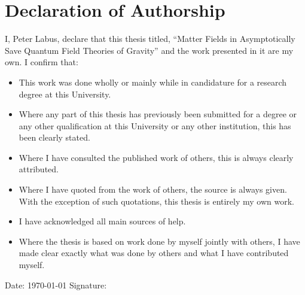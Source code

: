 \documentclass[11pt]{book}
\numberwithin{equation}{chapter}
\begin{document}

\chapter*{Declaration of Authorship}

\noindent I, Peter Labus, declare that this thesis titled,
``Matter Fields in Asymptotically Save Quantum Field Theories of Gravity''
and the work presented in it are my own. I confirm that:
\vfill

\begin{itemize}
\item This work was done wholly or mainly while in candidature for a research degree at this University.
\vfill
\item Where any part of this thesis has previously been submitted for a degree or any other qualification at this University or any other institution, this has been clearly stated.
\vfill
\item Where I have consulted the published work of others, this is always clearly attributed.
\vfill
\item Where I have quoted from the work of others, the source is always given. With the exception of such quotations, this thesis is entirely my own work.
\vfill
\item I have acknowledged all main sources of help.
\vfill
\item Where the thesis is based on work done by myself jointly with others,
  I have made clear exactly what was done by others and what I have contributed myself.
\end{itemize}
\vfill

\noindent Date: \dateall\today%
\hspace{4cm} Signature:\\
\end{document}
